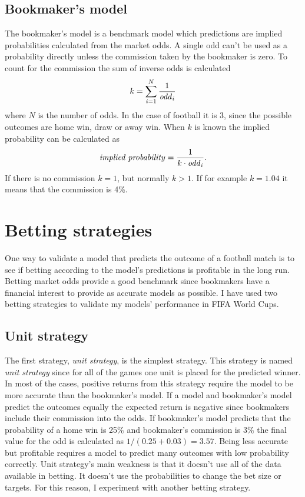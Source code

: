 \subsection{Bookmaker's model}
The bookmaker's model is a benchmark model which predictions are implied probabilities calculated from the market odds. A single odd can't be used as a probability directly unless the commission taken by the bookmaker is zero. To count for the commission the sum of inverse odds is calculated
\begin{equation}
    k = \sum_{i=1}^{N}\frac{1}{\text{\textit{odd}}_i}
\end{equation}
where $N$ is the number of odds. In the case of football it is 3, since the possible outcomes are home win, draw or away win.
When $k$ is known the implied probability can be calculated as
\begin{equation}
    \text{\textit{implied probability}} = \frac{1}{k \cdot \text{\textit{odd}}_i}\text{.}
\end{equation}
If there is no commission $k=1$, but normally $k>1$. If for example $k=1.04$ it means that the commission is 4\%.

\section{Betting strategies}
One way to validate a model that predicts the outcome of a football match is to see if betting according to the model's predictions is profitable in the long run. Betting market odds provide a good benchmark since bookmakers have a financial interest to provide as accurate models as possible. I have used two betting strategies to validate my models' performance in FIFA World Cups.

\subsection{Unit strategy}
The first strategy, \textit{unit strategy}, is the simplest strategy. This strategy is named \textit{unit strategy} since for all of the games one unit is placed for the predicted winner. In most of the cases, positive returns from this strategy require the model to be more accurate than the bookmaker's model. If a model and bookmaker's model predict the outcomes equally the expected return is negative since bookmakers include their commission into the odds. If bookmaker's model predicts that the probability of a home win is 25\% and bookmaker's commission is 3\% the final value for the odd is calculated as $1/(0.25+0.03) = 3.57$. Being less accurate but profitable requires a model to predict many outcomes with low probability correctly. Unit strategy's main weakness is that it doesn't use all of the data available in betting. It doesn't use the probabilities to change the bet size or targets. For this reason, I experiment with another betting strategy.

